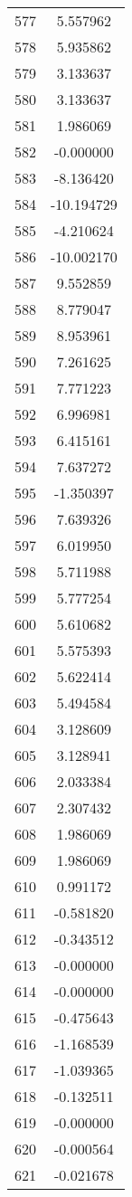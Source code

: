 \documentclass[12pt]{article}
\begin{document}
\begin{longtable}{@{}cc@{}}
577 & 5.557962 \\
578 & 5.935862 \\
579 & 3.133637 \\
580 & 3.133637 \\
581 & 1.986069 \\
582 & -0.000000 \\
583 & -8.136420 \\
584 & -10.194729 \\
585 & -4.210624 \\
586 & -10.002170 \\
587 & 9.552859 \\
588 & 8.779047 \\
589 & 8.953961 \\
590 & 7.261625 \\
591 & 7.771223 \\
592 & 6.996981 \\
593 & 6.415161 \\
594 & 7.637272 \\
595 & -1.350397 \\
596 & 7.639326 \\
597 & 6.019950 \\
598 & 5.711988 \\
599 & 5.777254 \\
600 & 5.610682 \\
601 & 5.575393 \\
602 & 5.622414 \\
603 & 5.494584 \\
604 & 3.128609 \\
605 & 3.128941 \\
606 & 2.033384 \\
607 & 2.307432 \\
608 & 1.986069 \\
609 & 1.986069 \\
610 & 0.991172 \\
611 & -0.581820 \\
612 & -0.343512 \\
613 & -0.000000 \\
614 & -0.000000 \\
615 & -0.475643 \\
616 & -1.168539 \\
617 & -1.039365 \\
618 & -0.132511 \\
619 & -0.000000 \\
620 & -0.000564 \\
621 & -0.021678 \\

\end{longtable}
\end{document}
